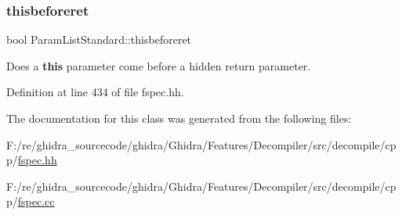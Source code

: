 \mbox{\label{class_param_list_standard_a65af086fa366444a788721fecc8afc86}} 
\subsubsection{\texorpdfstring{thisbeforeret}{thisbeforeret}}
{\footnotesize\ttfamily bool Param\+List\+Standard\+::thisbeforeret\hspace{0.3cm}{\ttfamily [protected]}}



Does a {\bfseries{this}} parameter come before a hidden return parameter. 



Definition at line 434 of file fspec.\+hh.



The documentation for this class was generated from the following files\+:\begin{DoxyCompactItemize}
\item 
F\+:/re/ghidra\+\_\+sourcecode/ghidra/\+Ghidra/\+Features/\+Decompiler/src/decompile/cpp/\mbox{\hyperlink{fspec_8hh}{fspec.\+hh}}\item 
F\+:/re/ghidra\+\_\+sourcecode/ghidra/\+Ghidra/\+Features/\+Decompiler/src/decompile/cpp/\mbox{\hyperlink{fspec_8cc}{fspec.\+cc}}\end{DoxyCompactItemize}
